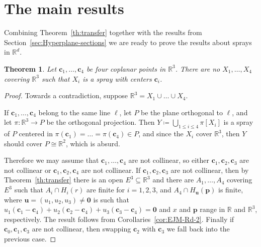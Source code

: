 \documentclass[12pt]{amsart}
\newcommand{\R}{\mathbb{R}}	%
\theoremstyle{plain}
\newtheorem{theorem}{Theorem}[section]
\theoremstyle{definition}
\theoremstyle{remark}
\begin{document}
\section{The main results}\label{sec:The-main-results}

Combining Theorem~\ref{th:transfer} together with the results from Section~\ref{sec:Hyperplane-sections} we are ready to prove the results about sprays in \( \R^d \).

\begin{theorem}\label{th:no4spraysinR3}
Let \( \mathbf{c}_1 , \dots , \mathbf{c}_4 \) be four coplanar points in \( \R^3 \).
There are no \( X_1 , \dots , X_4 \) covering \( \R^3 \) such that \( X_i \) is a spray with centers \( \mathbf{c}_i \).
\end{theorem}

\begin{proof}
Towards a contradiction, suppose \( \R^3 = X_1 \cup \dots \cup X_4 \).

If \( \mathbf{c}_1 , \dots , \mathbf{c}_4 \) belong to the same line \( \ell \), let \( P \) be the plane orthogonal to \( \ell \), and let \( \pi \colon \R^3 \to P \) be the orthogonal projection.
Then \( Y \coloneqq \bigcup_{1 \leq i \leq 4} \pi [ X_i ] \) is a spray of \( P \) centered in \( \pi ( \mathbf{c}_1 ) = \dots = \pi ( \mathbf{c}_4 ) \in P \), and since the \( X_i \) cover \( \R^3 \), then \( Y \) should cover \( P \cong \R^2 \), which is absurd.

Therefore we may assume that \( \mathbf{c}_1 , \dots , \mathbf{c}_4 \) are not collinear, so either \( \mathbf{c}_1 , \mathbf{c}_2 , \mathbf{c}_3 \) are not collinear or \( \mathbf{c}_1 , \mathbf{c}_2 , \mathbf{c}_4 \) are not collinear.
If \( \mathbf{c}_1 , \mathbf{c}_2 , \mathbf{c}_3 \) are not collinear, then by Theorem~\ref{th:transfer} there is an open \( E^3 \subseteq \R^3 \) and there are \( A_1 , \dots , A_4 \) covering \( E^3 \) such that \( A_i \cap H_i ( r ) \) are finite for \( i = 1 , 2 , 3 \), and \( A_4 \cap H_{\mathbf{u}} ( \mathbf{p} ) \) is finite, where \( \mathbf{u} = ( u_1 , u_2 , u_3 ) \neq \mathbf{0} \) is such that \( u_1 ( \mathbf{c}_1 - \mathbf{c}_4 ) + u_2 ( \mathbf{c}_2 - \mathbf{c}_4 ) + u_3 ( \mathbf{c}_3 - \mathbf{c}_4 ) = \mathbf{0} \) and \( x \) and \( \mathbf{p} \) range in \( \R \) and \( \R^3 \), respectively.
The result follows from Corollaries~\ref{cor:EJM-Rd-2}.
Finally if \( \mathbf{c}_0 , \mathbf{c}_1 , \mathbf{c}_3 \) are not collinear, then swapping \( \mathbf{c}_2 \) with \( \mathbf{c}_3 \) we fall back into the previous case.
\end{proof}
\end{document}
